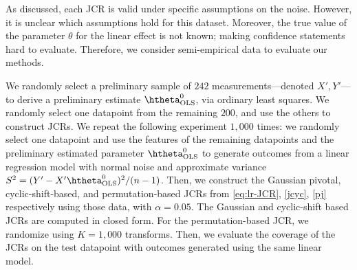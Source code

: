 \documentclass[english]{article}
\begin{document}
As discussed, each JCR is valid under specific assumptions on the noise.
However, it is unclear which assumptions hold for this dataset. 
Moreover, the true value of the parameter $\theta$ for the linear effect is not known; making confidence statements hard to evaluate.
Therefore, we consider semi-empirical data to evaluate our methods. 

We randomly select a preliminary sample of $242$ 
measurements---denoted $X', Y'$---to derive a preliminary estimate $\htheta_{\mathrm{OLS}}^0$, via ordinary least squares.
We randomly select one datapoint 
from the remaining $200$, 
and use the others to construct JCRs.
We repeat the following experiment $1,000$ times: 
we randomly select one datapoint and use the features of the remaining datapoints and the preliminary estimated parameter $\htheta_{\mathrm{OLS}}^0$ to generate outcomes from a linear regression model with normal noise and approximate variance $S^2 = (Y'-X'\htheta_{\mathrm{OLS}}^0)^2/(n-1)$. Then, we construct the Gaussian pivotal, cyclic-shift-based, and permutation-based JCRs from \eqref{eq:lr-JCR}, \eqref{jcyc}, \eqref{pj} respectively using those data, with $\alpha = 0.05$.
The Gaussian and cyclic-shift based JCRs are computed in closed form.
For the permutation-based JCR, 
we randomize using $K=1,000$ transforms. 
Then, we evaluate the coverage of the JCRs on the test datapoint with outcomes generated using the same linear model.
\end{document}
